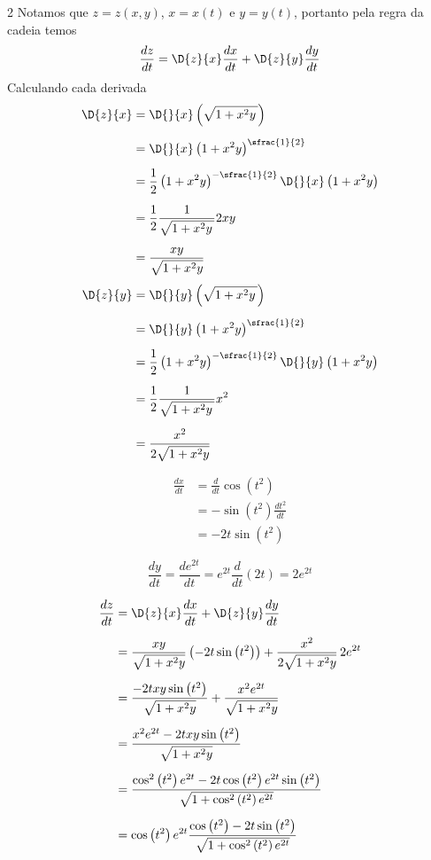 \documentclass[a4paper,12pt,fleqn]{article}
\begin{document}
\begin{answer}
\begin{multicols}{2}
  Notamos que \(z = z(x, y)\), \(x = x(t)\) e \(y = y(t)\),
  portanto pela regra da cadeia temos
  \[
    \frac{dz}{dt}
    = \D{z}{x} \frac{dx}{dt}
    + \D{z}{y} \frac{dy}{dt}
  \]
  Calculando cada derivada
  \begin{align*}
    \D{z}{x}
    & = \D{}{x} \left( \sqrt{1 + x^2 y\,} \right)
    \\[2mm]
    & = \D{}{x} \left( 1 + x^2 y \right)^{\sfrac{1}{2}}
    \\[2mm]
    & = \frac{1}{2}\left( 1 + x^2 y \right)^{-\sfrac{1}{2}}
        \D{}{x} \left( 1 + x^2 y \right)
    \\[2mm]
    & = \frac{1}{2}\frac{1}{\sqrt{1 + x^2 y\,}} 2xy
    \\[2mm]
    & = \frac{xy}{\sqrt{1 + x^2 y}}
  \end{align*}
  \begin{align*}
    \D{z}{y}
    & = \D{}{y} \left( \sqrt{1 + x^2 y\,} \right)
    \\[2mm]
    & = \D{}{y} \left( 1 + x^2 y \right)^{\sfrac{1}{2}}
    \\*[2mm]
    & = \frac{1}{2}\left( 1 + x^2 y \right)^{-\sfrac{1}{2}}
      \D{}{y} \left( 1 + x^2 y \right)
    \\*[2mm]
    & = \frac{1}{2}\frac{1}{\sqrt{1 + x^2 y\,}} x^2
    \\*[2mm]
    & = \frac{x^2}{2\sqrt{1 + x^2 y}}
  \end{align*}

  \begin{align*}
    \frac{dx}{dt}
    & = \frac{d}{dt}\cos\left(t^2\right) \\[2mm]
    & = -\sin\left(t^2\right) \frac{dt^2}{dt} \\[2mm]
    & = -2t\sin\left(t^2\right)
  \end{align*}

  \[
    \frac{dy}{dt}
    = \frac{de^{2t}}{dt}
    = e^{2t}\frac{d}{dt}(2t)
    = 2e^{2t}
  \]

  \begin{align*}
    \frac{dz}{dt}
    & = \D{z}{x} \frac{dx}{dt}
      + \D{z}{y} \frac{dy}{dt}
    \\[2mm]
    & = \frac{xy}{\sqrt{1 + x^2 y}} \left(-2t\sin\left(t^2\right)\right)
      + \frac{x^2}{2\sqrt{1 + x^2 y}} \, 2e^{2t}
    \\[2mm]
    & = \frac{-2txy\sin\left(t^2\right)}{\sqrt{1 + x^2 y}}
      + \frac{x^2e^{2t}}{\sqrt{1 + x^2 y}}
    \\[2mm]
    & = \frac{x^2e^{2t}-2txy\sin\left(t^2\right)}{\sqrt{1 + x^2 y}}
    \\[2mm]
    & = \frac{\cos^2\left(t^2\right)e^{2t}-2t\cos\left(t^2\right)e^{2t}\sin\left(t^2\right)}
             {\sqrt{1 + \cos^2\left(t^2\right) e^{2t}}}
   \\[2mm]
   & = \cos\left(t^2\right)e^{2t}
     \frac{\cos\left(t^2\right) - 2t\sin\left(t^2\right)}
          {\sqrt{1 + \cos^2\left(t^2\right) e^{2t}}}
  \end{align*}
\end{multicols}
\end{answer}
\end{document}

